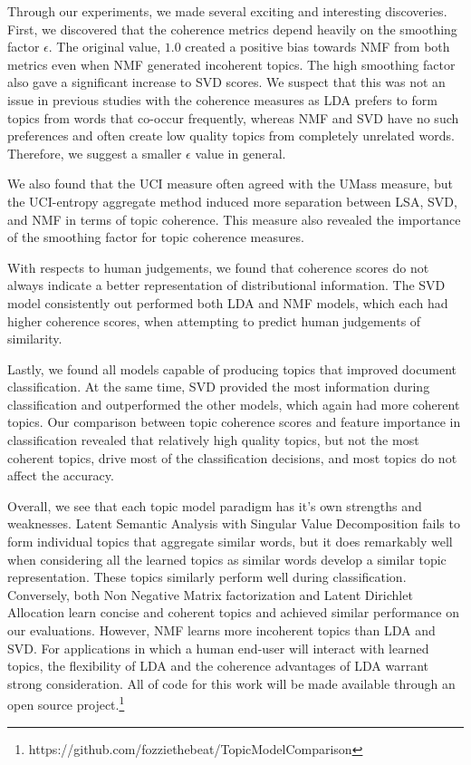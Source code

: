 \label{sec:discusssion}
Through our experiments, we made several exciting and interesting discoveries.
First, we discovered that the coherence metrics depend heavily on the smoothing
factor $\epsilon$.  The original value, $1.0$ created a positive bias towards
NMF from both metrics even when NMF generated incoherent topics.  The high
smoothing factor also gave a significant increase to SVD scores.  We suspect
that this was not an issue in previous studies with the coherence measures as
LDA prefers to form topics from words that co-occur frequently, whereas NMF and
SVD have no such preferences and often create low quality topics from completely
unrelated words.  Therefore, we suggest a smaller $\epsilon$ value in general.

We also found that the UCI measure often agreed with the UMass measure, but the
UCI-entropy aggregate method induced more separation between LSA, SVD, and NMF
in terms of topic coherence.  This measure also revealed the importance of the
smoothing factor for topic coherence measures.

With respects to human judgements, we found that coherence scores do not always
indicate a better representation of distributional information.  The SVD model
consistently out performed both LDA and NMF models, which each had higher
coherence scores, when attempting to predict human judgements of similarity.  

Lastly, we found all models capable of producing topics that improved document
classification.  At the same time, SVD provided the most information during
classification and outperformed the other models, which again had more coherent
topics.  Our comparison between topic coherence scores and feature importance in
classification revealed that relatively high quality topics, but not the most
coherent topics, drive most of the classification decisions, and most topics do
not affect the accuracy.  

Overall, we see that each topic model paradigm has it's own strengths and
weaknesses.  Latent Semantic Analysis with Singular Value Decomposition fails to
form individual topics that aggregate similar words, but it does remarkably well
when considering all the learned topics as similar words develop a similar topic
representation.  These topics similarly perform well during classification.
Conversely, both Non Negative Matrix factorization and Latent Dirichlet
Allocation learn concise and coherent topics and achieved similar performance on
our evaluations. However, NMF learns more incoherent topics than LDA and SVD.
For applications in which a human end-user will interact with learned topics,
the flexibility of LDA and the coherence advantages of LDA warrant strong
consideration.  All of code for this work will be made available through an open
source project.\footnote{https://github.com/fozziethebeat/TopicModelComparison}
